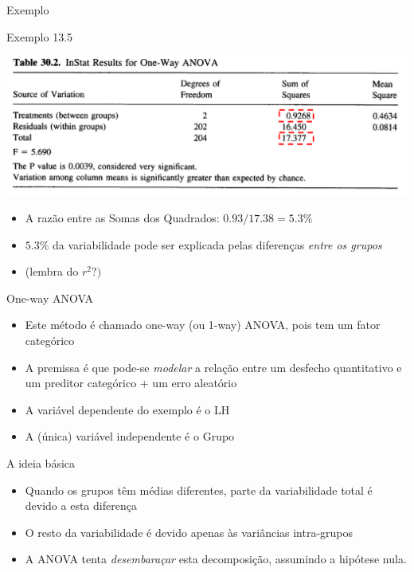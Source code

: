 \documentclass{beamer}
\begin{document}
\begin{frame}{Exemplo}
  \begin{exampleblock}{Exemplo 13.5}
    \begin{center}
      \includegraphics[width=.6\textwidth]{Topicos_adv/exemplo13_5-2}
    \end{center}
  \begin{itemize}
  \item A razão entre as Somas dos Quadrados: $0.93/17.38 = 5.3\%$
  \item $5.3\%$ da variabilidade pode ser explicada pelas diferenças {\em entre os grupos}
  \item (lembra do $r^2?)$
  \end{itemize}
  \end{exampleblock}
\end{frame}

\begin{frame}{One-way ANOVA}
  \begin{itemize}
  \item Este método é chamado one-way (ou 1-way) ANOVA, pois tem um fator categórico
  \item A premissa é que pode-se {\em modelar} a relação entre um desfecho quantitativo e um preditor categórico + um erro aleatório
  \item A variável dependente do exemplo é o LH
  \item A (única) variável independente é o Grupo
  \end{itemize}
\end{frame}

\begin{frame}{A ideia básica}
  \begin{itemize}
  \item Quando os grupos têm médias diferentes, parte da variabilidade total é devido a esta diferença
  \item O resto da variabilidade é devido apenas às variâncias intra-grupos
  \item A ANOVA tenta {\em desembaraçar} esta decomposição, assumindo a hipótese nula.
  \end{itemize}
\end{frame}
\end{document}
